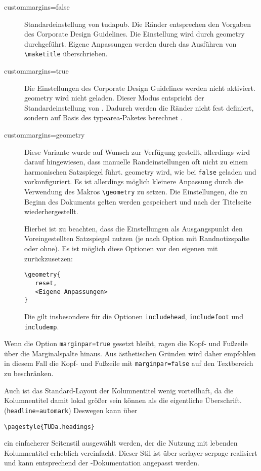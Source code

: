 \documentclass[
	german,%
	accentcolor=9c,%
]{tudapub}
\newcommand*{\code}[1]{\texttt{#1}}
\newcommand*{\pkg}[1]{\textsf{#1}}
\newcommand*{\cls}[1]{\textsf{#1}}
\begin{document}
\begin{description}
	\item[custommargins=false] Standardeinstellung von \cls{tudapub}. Die Ränder entsprechen den Vorgaben des Corporate Design Guidelines. Die Einstellung wird durch \pkg{geometry} durchgeführt. Eigene Anpassungen werden durch das Ausführen von \code{\textbackslash{}maketitle} überschrieben.
	\item[custommargins=true] Die Einstellungen des Corporate Design Guidelines werden nicht aktiviert. \pkg{geometry} wird nicht geladen. Dieser Modus entspricht der Standardeinstellung von \KOMAScript{}. Dadurch werden die Ränder nicht fest definiert, sondern auf Basis des \pkg{typearea}-Paketes berechnet \cite[vgl.][]{scrguide}.
	\item[custommargins=geometry]  Diese Variante wurde auf Wunsch zur Verfügung gestellt, allerdings wird darauf hingewiesen, dass manuelle Randeinstellungen oft nicht zu einem harmonischen Satzspiegel führt.
	      \pkg{geometry} wird, wie bei \code{false} geladen und vorkonfiguriert. Es ist allerdings möglich kleinere Anpassung durch die Verwendung des Makros \code{\textbackslash{}geometry} zu setzen. Die Einstellungen, die zu Beginn des Dokuments gelten werden gespeichert und nach der Titelseite wiederhergestellt.

	      Hierbei ist zu beachten, dass die Einstellungen als Ausgangspunkt den Voreingestellten Satzspiegel nutzen (je nach Option mit Randnotizspalte oder ohne). Es ist möglich diese Optionen vor den eigenen mit zurückzusetzen:
\begin{verbatim}
\geometry{
   reset,
   <Eigene Anpassungen>
}
\end{verbatim}
	      Die gilt insbesondere für die Optionen \code{includehead}, \code{includefoot} und \code{includemp}.
\end{description}

Wenn die Option \code{marginpar=true} gesetzt bleibt, ragen die Kopf- und Fußzeile über die Marginalspalte hinaus. Aus ästhetischen Gründen wird daher empfohlen in diesem Fall die Kopf- und Fußzeile  mit \code{marginpar=false}  auf den Textbereich zu beschränken.

Auch ist das Standard-Layout der Kolumnentitel wenig vorteilhaft, da die Kolumnentitel damit lokal größer sein können als die eigentliche Überschrift. (\code{headline=automark})
Deswegen kann über
\begin{verbatim}
\pagestyle{TUDa.headings}
\end{verbatim}
ein einfacherer Seitenstil ausgewählt werden, der die Nutzung mit lebenden Kolumnentitel erheblich vereinfacht. Dieser Stil ist über \pkg{scrlayer-scrpage} realisiert und kann entsprechend der \KOMAScript{}-Dokumentation angepasst werden.
\end{document}
